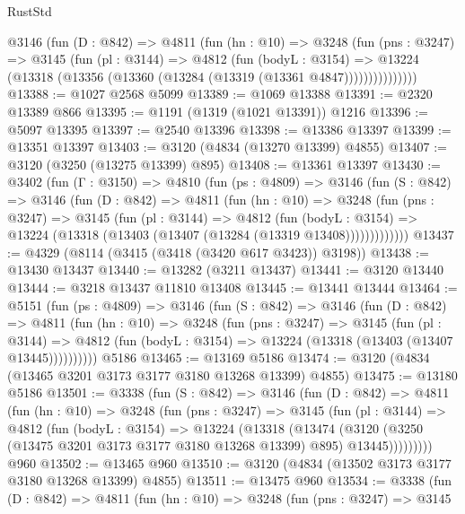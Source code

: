 \begin{lexlean}{RustStd}
\begin{coremodule}
          @3146
            (fun (D : @842) =>
            @4811
              (fun (hn : @10) =>
              @3248
                (fun (pns : @3247) =>
                @3145
                  (fun (pl : @3144) =>
                  @4812
                    (fun (bodyL : @3154) =>
                    @13224 (@13318 (@13356 (@13360 (@13284 (@13319 (@13361 @4847)))))))))))))))
@13388 := @1027 @2568 @5099
@13389 := @1069 @13388
@13391 := @2320 @13389 @866
@13395 := @1191 (@1319 (@1021 @13391)) @1216
@13396 := @5097 @13395
@13397 := @2540 @13396
@13398 := @13386 @13397
@13399 := @13351 @13397
@13403 := @3120 (@4834 (@13270 @13399) @4855)
@13407 := @3120 (@3250 (@13275 @13399) @895)
@13408 := @13361 @13397
@13430 := @3402
    (fun (Γ : @3150) =>
    @4810
      (fun (ps : @4809) =>
      @3146
        (fun (S : @842) =>
        @3146
          (fun (D : @842) =>
          @4811
            (fun (hn : @10) =>
            @3248
              (fun (pns : @3247) =>
              @3145
                (fun (pl : @3144) =>
                @4812
                  (fun (bodyL : @3154) =>
                  @13224 (@13318 (@13403 (@13407 (@13284 (@13319 @13408)))))))))))))
@13437 := @4329 (@8114 (@3415 (@3418 (@3420 @617 @3423)) @3198))
@13438 := @13430 @13437
@13440 := @13282 (@3211 @13437)
@13441 := @3120 @13440
@13444 := @3218 @13437 @11810 @13408
@13445 := @13441 @13444
@13464 := @5151
    (fun (ps : @4809) =>
    @3146
      (fun (S : @842) =>
      @3146
        (fun (D : @842) =>
        @4811
          (fun (hn : @10) =>
          @3248
            (fun (pns : @3247) =>
            @3145
              (fun (pl : @3144) =>
              @4812 (fun (bodyL : @3154) => @13224 (@13318 (@13403 (@13407 @13445))))))))))
    @5186
@13465 := @13169 @5186
@13474 := @3120 (@4834 (@13465 @3201 @3173 @3177 @3180 @13268 @13399) @4855)
@13475 := @13180 @5186
@13501 := @3338
    (fun (S : @842) =>
    @3146
      (fun (D : @842) =>
      @4811
        (fun (hn : @10) =>
        @3248
          (fun (pns : @3247) =>
          @3145
            (fun (pl : @3144) =>
            @4812
              (fun (bodyL : @3154) =>
              @13224
                (@13318
                  (@13474
                    (@3120
                      (@3250 (@13475 @3201 @3173 @3177 @3180 @13268 @13399) @895)
                      @13445)))))))))
    @960
@13502 := @13465 @960
@13510 := @3120 (@4834 (@13502 @3173 @3177 @3180 @13268 @13399) @4855)
@13511 := @13475 @960
@13534 := @3338
    (fun (D : @842) =>
    @4811
      (fun (hn : @10) =>
      @3248
        (fun (pns : @3247) =>
        @3145

\end{coremodule}
\end{lexlean}
